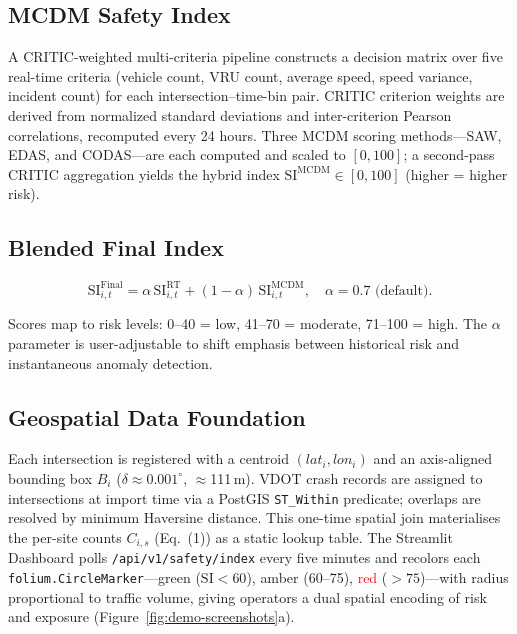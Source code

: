 \documentclass[conference]{IEEEtran}
\begin{document}
\subsection{MCDM Safety Index}

A CRITIC-weighted multi-criteria pipeline \cite{Amraji2025CombinedSafetyIndex}
constructs a decision matrix over five real-time criteria
(vehicle count, VRU count, average speed, speed variance, incident count)
for each intersection--time-bin pair.
CRITIC criterion weights are derived from normalized standard deviations and
inter-criterion Pearson correlations, recomputed every 24 hours.
Three MCDM scoring methods---SAW, EDAS, and CODAS---are each computed and scaled
to $[0,100]$; a second-pass CRITIC aggregation yields the hybrid index
$\mathrm{SI}^{\text{MCDM}}\in[0,100]$ (higher = higher risk).

\subsection{Blended Final Index}

\begin{equation}
\mathrm{SI}^{\text{Final}}_{i,t} =
\alpha\,\mathrm{SI}^{\text{RT}}_{i,t} +
(1-\alpha)\,\mathrm{SI}^{\text{MCDM}}_{i,t},
\quad \alpha = 0.7\text{ (default)}.
\label{eq:blend}
\end{equation}

Scores map to risk levels: 0--40 = low, 41--70 = moderate, 71--100 = high.
The $\alpha$ parameter is user-adjustable to shift emphasis between historical risk
and instantaneous anomaly detection.

\subsection{Geospatial Data Foundation}

Each intersection is registered with a centroid $(lat_i, lon_i)$ and an
axis-aligned bounding box $B_i$ ($\delta\!\approx\!0.001^{\circ}$, $\approx$111\,m).
VDOT crash records are assigned to intersections at import time via a PostGIS
\texttt{ST\_Within} predicate; overlaps are resolved by minimum Haversine distance.
This one-time spatial join materialises the per-site counts $C_{i,s}$ (Eq.~(1))
as a static lookup table.
The Streamlit Dashboard polls \texttt{/api/v1/safety/index} every five minutes and
recolors each \texttt{folium.CircleMarker}---\textcolor{green!60!black}{green}
($\mathrm{SI}<60$), \textcolor{orange!80!black}{amber} (60--75),
\textcolor{red}{red} ($>75$)---with radius proportional to traffic volume,
giving operators a dual spatial encoding of risk and exposure
(Figure~\ref{fig:demo-screenshots}a).
\end{document}
